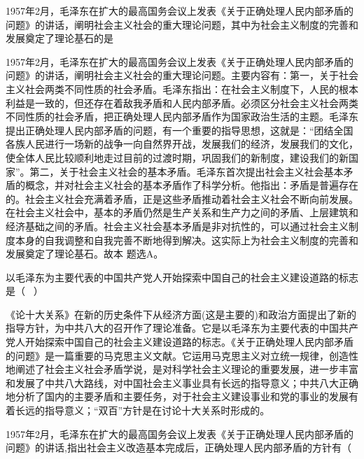 \question 1957年2月，毛泽东在扩大的最高国务会议上发表《关于正确处理人民内部矛盾的问题》的讲话，阐明社会主义社会的重大理论问题，其中为社会主义制度的完善和发展奠定了理论基石的是
\par{}
\begin{solution}1957年2月，毛泽东在扩大的最高国务会议上发表《关于正确处理人民内部矛盾的问题》的讲话，阐明社会主义社会的重大理论问题。主要内容有：第一，关于社会主义社会两类不同性质的社会矛盾。毛泽东指出：在社会主义制度下，人民的根本利益是一致的，但还存在着敌我矛盾和人民内部矛盾。必须区分社会主义社会两类不同性质的社会矛盾，把正确处理人民内部矛盾作为国家政治生活的主题。毛泽东提出正确处理人民内部矛盾的问题，有一个重要的指导思想，这就是：``团结全国各族人民进行一场新的战争一向自然界开战，发展我们的经济，发展我们的文化，使全体人民比较顺利地走过目前的过渡时期，巩固我们的新制度，建设我们的新国家''。第二，关于社会主义社会的基本矛盾。毛泽东首次提出社会主义社会基本矛盾的概念，并对社会主义社会的基本矛盾作了科学分析。他指出：矛盾是普遍存在的。社会主义社会充满着矛盾，正是这些矛盾推动着社会主义社会不断向前发展。在社会主义社会中，基本的矛盾仍然是生产关系和生产力之间的矛盾、上层建筑和经济基础之间的矛盾。社会主义社会基本矛盾是非对抗性的，可以通过社会主义制度本身的自我调整和自我完善不断地得到解决。这实际上为社会主义制度的完善和发展奠定了理论基石。故本
题选A。
\end{solution}
\question 以毛泽东为主要代表的中国共产党人开始探索中国自己的社会主义建设道路的标志是（
~）
\par{}
\begin{solution}《论十大关系》在新的历史条件下从经济方面(这是主要的)和政治方面提出了新的指导方针，为中共八大的召开作了理论准备。它是以毛泽东为主要代表的中国共产党人开始探索中国自己的社会主义建设道路的标志。《关于正确处理人民内部矛盾的问题》是一篇重要的马克思主义文献。它运用马克思主义对立统一规律，创造性地阐述了社会主义社会矛盾学说，是对科学社会主义理论的重要发展，进一步丰富和发展了中共八大路线，对中国社会主义事业具有长远的指导意义；中共八大正确地分析了国内的主要矛盾和主要任务，对于社会主义建设事业和党的事业的发展有着长远的指导意义；``双百''方针是在讨论十大关系时形成的。
\end{solution}
\question 1957年2月，毛泽东在扩大的最高国务会议上发表《关于正确处理人民内部矛盾的问题》的讲话,指出社会主义改造基本完成后，正确处理人民内部矛盾的方针有（

